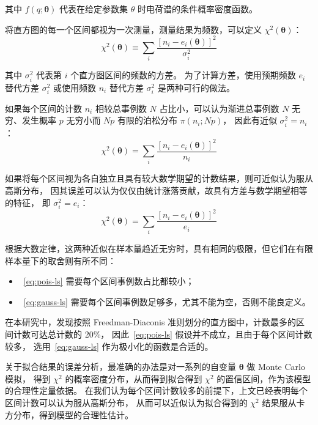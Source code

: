 其中 $f(q;\boldsymbol{\theta})$ 代表在给定参数集 $\theta$ 时电荷谱的条件概率密度函数。

将直方图的每一个区间都视为一次测量，测量结果为频数，可以定义 $\chi^2(\boldsymbol{\theta})$：
\begin{equation}
    \chi^2(\boldsymbol{\theta})\equiv\sum_{i}\frac{\left[n_i-e_i(\boldsymbol{\theta})\right]^2}{\sigma_i^2}
    \label{eq:chi-sq}
\end{equation}

其中 $\sigma_i^2$ 代表第 $i$ 个直方图区间的频数的方差。
为了计算方差，使用预期频数 $e_i$ 替代方差 $\sigma_i^2$ 或使用频数 $n_i$ 替代方差 $\sigma_i^2$ 是两种可行的做法。

如果每个区间的计数 $n_i$ 相较总事例数 $N$ 占比小，可以认为渐进总事例数 $N$ 无穷、发生概率 $p$ 无穷小而 $Np$ 有限的泊松分布 $\pi(n_i;Np)$，
因此有近似 $\sigma^2_i=n_i$：
\begin{equation}
    \chi^2(\boldsymbol{\theta})=\sum_{i}\frac{\left[n_i-e_i(\boldsymbol{\theta})\right]^2}{n_i}
    \label{eq:pois-ls}
\end{equation}

如果将每个区间视为各自独立且具有较大数学期望的计数结果，则可近似认为服从高斯分布，
因其误差可以认为仅仅由统计涨落贡献，故具有方差与数学期望相等的特征，
即 $\sigma^2_i=e_i$：
\begin{equation}
    \chi^2(\boldsymbol{\theta})=\sum_{i}\frac{\left[n_i-e_i(\boldsymbol{\theta})\right]^2}{e_i}
    \label{eq:gauss-ls}
\end{equation}

根据大数定律，这两种近似在样本量趋近无穷时，具有相同的极限，但它们在有限样本量下的取舍则有所不同：
\begin{itemize}
    \item~\eqref{eq:pois-ls} 需要每个区间事例数占比都较小；
    \item~\eqref{eq:gauss-ls} 需要每个区间事例数足够多，尤其不能为空，否则不能良定义。
\end{itemize}

在本研究中，发现按照 Freedman-Diaconis 准则划分的直方图中，计数最多的区间计数可达总计数的 20\%，
因此~\eqref{eq:pois-ls} 假设并不成立，且由于每个区间计数较多，
选用~\eqref{eq:gauss-ls} 作为极小化的函数是合适的。

关于拟合结果的误差分析，最准确的办法是对一系列的自变量 $\boldsymbol{\theta}$ 做 Monte Carlo 模拟，
得到 $\chi^2$ 的概率密度分布，从而得到拟合得到 $\chi^2$ 的置信区间，作为该模型的合理性定量依据。
在我们认为每个区间计数较多的前提下，上文已经表明每个区间计数可以认为服从高斯分布，
从而可以近似认为拟合得到的 $\chi^2$ 结果服从卡方分布，得到模型的合理性估计。

